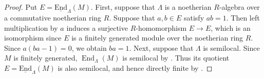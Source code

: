\documentclass{amsart}
\theoremstyle{definition}
\theoremstyle{remark}
\numberwithin{equation}{thm}
\def\End{\operatorname{End}}
\def\Endl{\operatorname{\underline{End}}}
\begin{document}
\begin{proof}
Put $E=\Endl_{\Lambda}(M)$.
First, suppose that $\Lambda$ is a noetherian $R$-algebra over a commutative noetherian ring $R$.
Suppose that $a,b\in E$ satisfy $ab=1$.
Then left multiplication by $a$ induces a surjective $R$-homomorphism $E\to E$, which is an isomorphism since $E$ is a finitely generated module over the noetherian ring $R$.
Since $a(ba-1)=0$, we obtain $ba=1$.
Next, suppose that $\Lambda$ is semilocal.
Since $M$ is finitely generated, $\End_\Lambda(M)$ is semilocal by \cite[Theorem 3.3]{FH}.
Thus its quotient $E=\Endl_\Lambda(M)$ is also semilocal, and hence directly finite by \cite[Proposition 20.8]{Lam}.
\end{proof}
\end{document}

